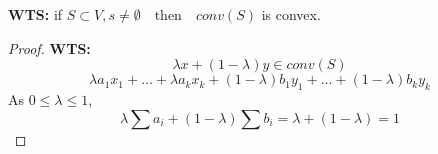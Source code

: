 \documentclass[12pt]{article}
\newenvironment{problem}[2][Problem]{\begin{trivlist}
\item[\hskip \labelsep {\bfseries #1}\hskip \labelsep {\bfseries #2.}]}{\end{trivlist}}
\begin{document}
\begin{problem}{7.1}
\textbf{WTS:} if $ S \subset V, s \neq \emptyset \quad \text{then} \quad conv(S)$ is convex.
\end{problem}
\begin{proof}
\textbf{WTS:} $$\lambda x + (1 - \lambda)y \in conv(S)$$
$$ \lambda a_1x_1 + \hdots + \lambda a_kx_k + (1-\lambda)b_1y_1 + \hdots + (1-\lambda)b_ky_k
$$
As $0 \leq \lambda \leq 1$,
$$ \lambda \sum a_i + (1-\lambda)\sum b_i  = \lambda + (1-\lambda) = 1
$$
\end{proof}
\end{document}
